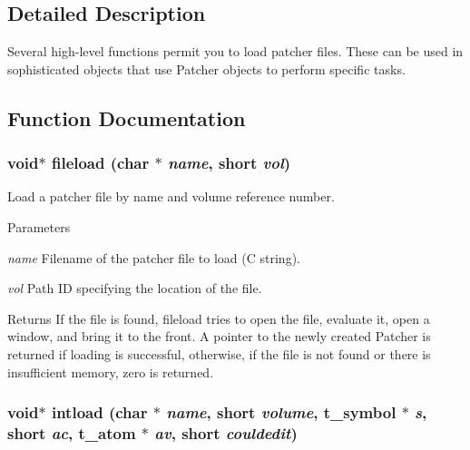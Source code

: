 \subsection{Detailed Description}
Several high-\/level functions permit you to load patcher files. These can be used in sophisticated objects that use Patcher objects to perform specific tasks. 

\subsection{Function Documentation}
\hypertarget{group__loading__max__files_ga1fb5c65c6c0ff9d2c92a7f95da9c7635}{
\subsubsection[{fileload}]{\setlength{\rightskip}{0pt plus 5cm}void$\ast$ fileload (char $\ast$ {\em name}, \/  short {\em vol})}}
\label{group__loading__max__files_ga1fb5c65c6c0ff9d2c92a7f95da9c7635}


Load a patcher file by name and volume reference number. 
\begin{DoxyParams}{Parameters}
\item[{\em name}]Filename of the patcher file to load (C string). \item[{\em vol}]Path ID specifying the location of the file. \end{DoxyParams}
\begin{DoxyReturn}{Returns}
If the file is found, fileload tries to open the file, evaluate it, open a window, and bring it to the front. A pointer to the newly created Patcher is returned if loading is successful, otherwise, if the file is not found or there is insufficient memory, zero is returned. 
\end{DoxyReturn}
\hypertarget{group__loading__max__files_gaf04b19ac11c4ce1d2641aa409cbd7128}{
\subsubsection[{intload}]{\setlength{\rightskip}{0pt plus 5cm}void$\ast$ intload (char $\ast$ {\em name}, \/  short {\em volume}, \/  {\bf t\_\-symbol} $\ast$ {\em s}, \/  short {\em ac}, \/  {\bf t\_\-atom} $\ast$ {\em av}, \/  short {\em couldedit})}}
\label{group__loading__max__files_gaf04b19ac11c4ce1d2641aa409cbd7128}


